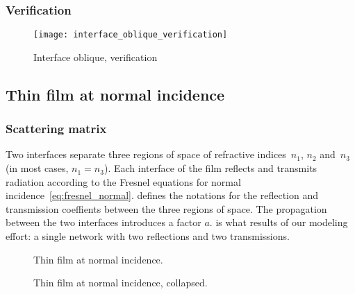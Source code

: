 \subsubsection{Verification}


\begin{figure}[hbtp]
    \centering
    \texttt{[image: interface\_oblique\_verification]}
    \caption{Interface oblique, verification}
    \label{fig:interface_oblique_verification}
\end{figure}


\subsection{Thin film at normal incidence}
\label{sec:thin_film_at_normal_incidence}

\subsubsection{Scattering matrix}

Two interfaces separate three regions of space of refractive indices~$n_1$, $n_2$ and~$n_3$ (in most cases, $n_1=n_3$).
Each interface of the film reflects and transmits radiation according to the Fresnel equations for normal incidence~\eqref{eq:fresnel_normal}.
 defines the notations for the reflection and transmission coeffients between the three regions of space.
The propagation between the two interfaces introduces a factor $a$.
 is what results of our modeling effort: a single network with two reflections and two transmissions.

\begin{figure}[hbtp]
    \centering
    
    \caption{Thin film at normal incidence.}
    \label{fig:thin_film_normal}
\end{figure}
\begin{figure}[hbtp]
    \centering
    
    \caption{Thin film at normal incidence, collapsed.}
    \label{fig:thin_film_normal_collapsed}
\end{figure}

